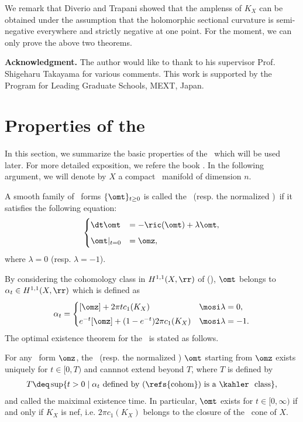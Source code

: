 \documentclass[12pt]{amsart}
\begin{document}
We remark that  Diverio and Trapani \citep{2016arXiv160601381D} showed that the amplenss of $K_X$ can be obtained under the assumption that the holomorphic sectional curvature is semi-negative everywhere and strictly negative at one point.  
For the moment, we can only prove the above two theorems.

\noindent 
\textbf{Acknowledgment. }The author would like to thank to his supervisor Prof. Shigeharu Takayama for various comments.
This work is supported by the Program for Leading Graduate Schools, MEXT, Japan.

\section{Properties of the \krf }

In this section, we summarize the basic properties of the \krf \ which will be used later. For more detailed exposition, we refere the book \citep{BEG13IntrotoKRF}.
In the following argument, we will denote by $X$ a compact \kahler \  manifold of dimension $n$. 

\begin{definition}
A smooth family of \kahler \ forms $\{ \omt \}_{t\ge 0}$ is called the \krf \ (resp. the normalized \krf )\ if it satisfies the following equation:
\begin{align}\label{krfeq}
\begin{cases}
	\dt \omt
		&= -\ric(\omt) + \lambda \omt, \\[5pt]
	\omt|_{t=0}
		&=\omz, 
\end{cases}
\end{align}
where $\lambda =0$ (resp.  $\lambda =-1$). 
\end{definition}

By considering the cohomology class in $H^{1,1 }(X, \rr)$ of (), $\omt$ belongs to $\alpha_t \in H^{1,1 }(X, \rr)$ which is defined as 
\begin{align}\label{cohom}
	\alpha_t  = 
		\begin{cases}
			[\omz ] + 2\pi t c_1(K_X) &\mosi \lambda =0, \\[3pt]
			e^{-t }[\omz ] + (1-e^{-t}) 2\pi  c_1(K_X) &\mosi \lambda =-1.
		\end{cases}
\end{align}
The optimal existence theorem for the \krf \ is stated as follows. 
\begin{theorem}\label{existthm}
For any \kahler \ form $\omz$, the \krf \ (resp. the normalized \krf) $\omt$ starting from $\omz$ exists uniquely for $t \in [0,T)$ and cannnot extend beyond $T$,  where $T$ is defined by
\begin{align}\label{maximaltime}
	T \deq \sup \{ t>0 \mid \alpha_t \mbox{ defined by (\refs{cohom}) is a \kahler \ class}  \},
\end{align}
and called the maiximal existence time.
In particular, $\omt$ exists for $t\in [0,\infty)$ if and only if $K_X$ is nef, i.e. $2\pi c_1(K_X)$ belongs to the closure of the \kahler \ cone of $X$.
\end{theorem}
\end{document}
